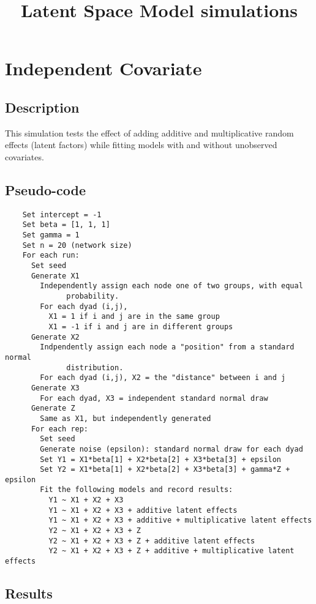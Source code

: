 \documentclass[12pt]{article}
\title{Latent Space Model simulations}
\begin{document}
\maketitle

\section{Independent Covariate}

\subsection{Description}
  This simulation tests the effect of adding additive and multiplicative random effects (latent factors) while fitting models with and without unobserved covariates.
\subsection{Pseudo-code}
  \begin{verbatim}
    Set intercept = -1
    Set beta = [1, 1, 1]
    Set gamma = 1
    Set n = 20 (network size)
    For each run:
      Set seed
      Generate X1
        Independently assign each node one of two groups, with equal
              probability.
        For each dyad (i,j), 
          X1 = 1 if i and j are in the same group
          X1 = -1 if i and j are in different groups
      Generate X2
        Indpendently assign each node a "position" from a standard normal
              distribution.
        For each dyad (i,j), X2 = the "distance" between i and j
      Generate X3
        For each dyad, X3 = independent standard normal draw
      Generate Z
        Same as X1, but independently generated
      For each rep:
        Set seed
        Generate noise (epsilon): standard normal draw for each dyad
        Set Y1 = X1*beta[1] + X2*beta[2] + X3*beta[3] + epsilon
        Set Y2 = X1*beta[1] + X2*beta[2] + X3*beta[3] + gamma*Z + epsilon
        Fit the following models and record results:
          Y1 ~ X1 + X2 + X3
          Y1 ~ X1 + X2 + X3 + additive latent effects
          Y1 ~ X1 + X2 + X3 + additive + multiplicative latent effects
          Y2 ~ X1 + X2 + X3 + Z
          Y2 ~ X1 + X2 + X3 + Z + additive latent effects
          Y2 ~ X1 + X2 + X3 + Z + additive + multiplicative latent effects
	\end{verbatim}
\subsection{Results}
	
\end{document}
